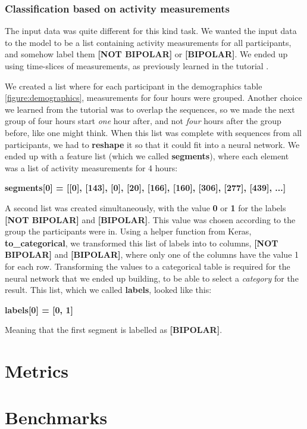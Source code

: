 \subsubsection{Classification based on activity measurements}

The input data was quite different for this kind task. We wanted the input data to the model to be a list containing activity measurements for all participants,
and somehow label them \textbf{[NOT BIPOLAR]} or \textbf{[BIPOLAR]}. We ended up using time-slices of measurements, 
as previously learned in the tutorial \cite{1d_cnn}.

We created a list where for each participant in the demographics table \ref{figure:demographics}, measurements for four hours were grouped. 
Another choice we learned from the tutorial was to overlap the sequences, so we made the next group of four hours start \textit{one} hour after, 
and not \textit{four} hours after the group before, like one might think. When this list was complete with sequences from all participants, we 
had to \textbf{reshape} it so that it could fit into a neural network. We ended up with a feature list (which we called \textbf{segments}), 
where each element was a list of activity measurements for 4 hours: 

\textbf{segments[0] = [[0], [143], [0], [20], [166], [160], [306], [277], [439], ...]}

\noindent A second list was created simultaneously, with the value \textbf{0} or \textbf{1} for the labels \textbf{[NOT BIPOLAR]} and \textbf{[BIPOLAR]}.
This value was chosen according to the group the participants were in. Using a helper function from Keras, \textbf{to\_categorical}, we transformed this 
list of labels into to columns, \textbf{[NOT BIPOLAR]} and \textbf{[BIPOLAR]}, where only one of the columns have the value 1 for each row. Transforming 
the values to a categorical table is required for the neural network that we ended up building, to be able to select a \textit{category} for the result. 
This list, which we called \textbf{labels}, looked like this: 

\textbf{labels[0] = [0, 1]}

\noindent Meaning that the first segment is labelled as \textbf{[BIPOLAR]}.

\section{Metrics}

\section{Benchmarks}
